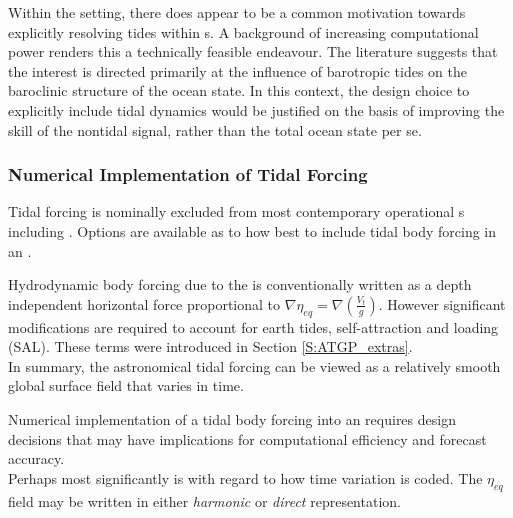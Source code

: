 
Within the \GODAE{} setting, there does appear to be a common motivation towards explicitly resolving tides within \OGCM{}s.  
A background of increasing computational power renders this a technically feasible endeavour.  
The literature suggests that the interest is directed primarily at the influence of barotropic tides on the baroclinic structure of the ocean state.   
In this context, the design choice to explicitly include tidal dynamics would be justified on the basis of improving the skill of the nontidal signal, rather than the total ocean state per se.







\subsubsection{Numerical Implementation of Tidal Forcing}
\label{S:numerical_impl}

Tidal forcing is nominally excluded from most contemporary operational \OGCM{}s including \BL{}.   Options are available as to how best to include tidal body forcing in an \OGCM{}.


Hydrodynamic body forcing due to the \ATGP{} is conventionally written as a depth independent horizontal force proportional to $\nabla \eta_{eq}=\nabla \left( \frac{V_t}{g} \right)$.  However significant modifications are required to account for earth tides, self-attraction and loading (SAL).   These terms were introduced in Section \ref{S:ATGP_extras}.\\
In summary, the astronomical tidal forcing can be viewed as a relatively smooth global surface field that varies in time.



Numerical implementation of a tidal body forcing into an \OGCM{} requires design decisions that may have implications for computational efficiency and forecast accuracy.\\
Perhaps most significantly is with regard to how time variation is coded. The $\eta_{eq}$ field may be written in either \emph{harmonic} or \emph{direct} representation.\\



